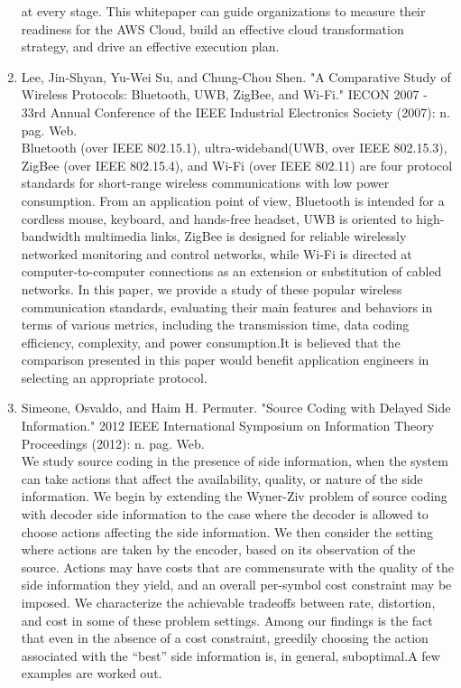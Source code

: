 \documentclass[oneside,a4paper,12pt]{report}
\begin{document}
\begin{enumerate}
at every stage. This whitepaper can guide organizations to measure their
readiness for the AWS Cloud, build an effective cloud transformation strategy,
and drive an effective execution plan.\\
\item Lee, Jin-Shyan, Yu-Wei Su, and Chung-Chou Shen. "A Comparative Study of Wireless Protocols: Bluetooth, UWB, ZigBee, and Wi-Fi." IECON 2007 - 33rd Annual Conference of the IEEE Industrial Electronics Society (2007): n. pag. Web.\\
Bluetooth (over IEEE 802.15.1), ultra-wideband(UWB, over IEEE 802.15.3), ZigBee (over IEEE 802.15.4), and Wi-Fi (over IEEE 802.11) are four protocol standards for short-range wireless communications with low power consumption. From an application point of view, Bluetooth is intended for a cordless mouse, keyboard, and hands-free headset, UWB is oriented to high-bandwidth multimedia links, ZigBee is designed for reliable wirelessly networked monitoring and control networks, while Wi-Fi is directed at computer-to-computer connections as an extension or substitution of cabled networks. In this paper, we provide a study of these popular wireless communication standards, evaluating their main features and behaviors in terms of various metrics, including the transmission time, data coding efficiency, complexity, and power consumption.It is believed that the comparison presented in this paper would benefit application engineers in selecting an appropriate protocol.\\
\item Simeone, Osvaldo, and Haim H. Permuter. "Source Coding with Delayed Side Information." 2012 IEEE International Symposium on Information Theory Proceedings (2012): n. pag. Web.\\
We study source coding in the presence of side information, when the system can take actions that affect the availability, quality, or nature of the side information. We begin by extending the Wyner-Ziv problem of source coding with decoder side information to the case where the decoder is allowed to choose actions affecting the side information. We then consider the setting where actions are taken by the encoder, based on its observation of the source. Actions may have costs that are commensurate with the quality of the side information they yield, and an overall per-symbol cost constraint may be imposed. We characterize the achievable tradeoffs between rate, distortion, and cost in some of these problem settings. Among our findings is the fact that even in the absence of a cost constraint, greedily choosing the action associated with the “best” side information is, in general, suboptimal.A few examples are worked out.\\

\end{enumerate}
\end{document}

